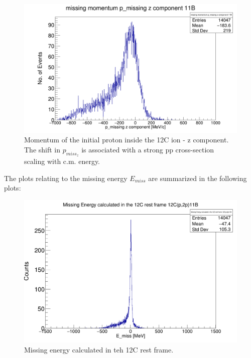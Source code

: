 \documentclass{report}
\begin{document}
\begin{figure}[!htb]
  \includegraphics[width=\linewidth]{missing_mom_11B_z_comp.png}
  \caption{Momentum of the initial proton inside the 12C ion - z component. The shift in $p_{miss_z}$ is associated with a strong pp cross-section scaling with c.m. energy.}
\end{figure}
\newpage
The plots relating to the missing energy $E_{miss}$ are summarized in the following plots:\newline
\begin{figure}[!htb]
  \includegraphics[width=\linewidth]{missing_E_12C_11B.png}
  \caption{Missing energy calculated in teh 12C rest frame.}
\end{figure}
\end{document}
